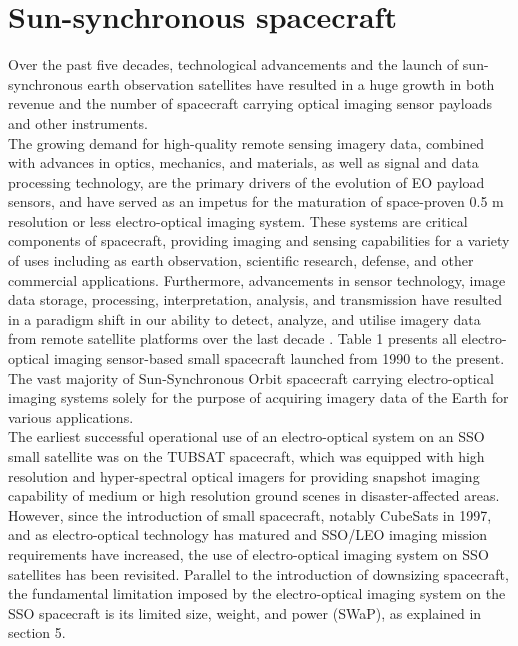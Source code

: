 \documentclass[final,5p,times,twocolumn]{elsarticle}
\begin{document}
\section{Sun-synchronous spacecraft}
Over the past five decades, technological advancements and the launch of sun-synchronous earth observation satellites have resulted in a huge growth in both revenue and the number of spacecraft carrying optical imaging sensor payloads and other instruments.  \\
The growing demand for high-quality remote sensing imagery data, combined with advances in optics, mechanics, and materials, as well as signal and data processing technology, are the primary drivers of the evolution of EO payload sensors, and have served as an impetus for the maturation of space-proven 0.5 m resolution or less \citep{demirel2005one, sandau2010status} electro-optical imaging system. These systems are critical components of spacecraft, providing imaging and sensing capabilities for a variety of uses including as earth observation, scientific research, defense, and other commercial applications. Furthermore, advancements in sensor technology, image data storage, processing, interpretation, analysis, and transmission have resulted in a paradigm shift in our ability to detect, analyze, and utilise imagery data from remote satellite platforms over the last decade \cite{arthur1997}. Table 1 presents all electro-optical imaging sensor-based small spacecraft launched from 1990 to the present.\\
The vast majority of Sun-Synchronous Orbit spacecraft carrying electro-optical imaging systems solely for the purpose of acquiring imagery data of the Earth for various applications.\\
The earliest successful operational use of an electro-optical system on an SSO small satellite was on the TUBSAT spacecraft, which was equipped with high resolution and hyper-spectral optical imagers \citep{roemer2003flight} for providing snapshot imaging capability of medium or high resolution ground scenes in disaster-affected areas. \\
However, since the introduction of small spacecraft, notably CubeSats in 1997, and as electro-optical technology has matured and SSO/LEO imaging mission requirements have increased, the use of electro-optical imaging system on SSO satellites has been revisited.
Parallel to the introduction of downsizing spacecraft, the fundamental limitation imposed by the electro-optical imaging system on the SSO spacecraft is its limited size, weight, and power (SWaP), as explained in section 5.  \\
\end{document}
